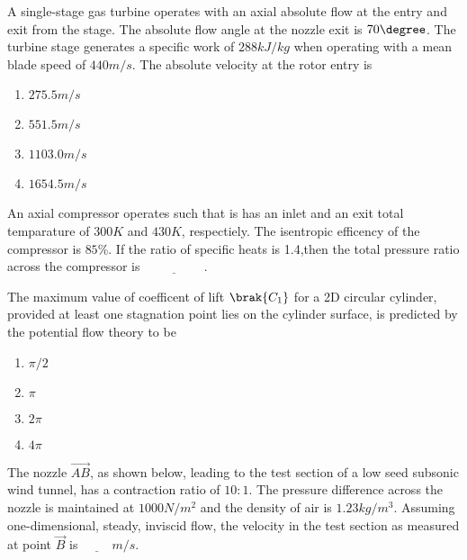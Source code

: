 
\iffalse
    \author{EE24BTECH11043}
    \section{ae}
    \chapter{2016}
\fi

	\item A single-stage gas turbine operates with an axial absolute flow at the entry and exit from the stage. The absolute flow angle at the nozzle exit is $70 \degree$. The turbine stage generates a specific work of $288 kJ/kg$ when operating with a mean blade speed of $440m/s$. The absolute velocity at the rotor entry is
		\begin{enumerate}
			\item $275.5 m/s$
			\item $551.5 m/s$
			\item $1103.0 m/s$
			\item $1654.5 m/s$
		\end{enumerate}
	\item An axial compressor operates such that is has an inlet and an exit total temparature of $300 K$ and $430 K$, respectiely. The isentropic efficency of the compressor is $85 \%$. If the ratio of specific heats is 1.4,then the total pressure ratio across the compressor is $\underline{\hspace{2cm}}$.
	\item The maximum value of coefficent of lift $\brak{C_1}$ for a 2D circular cylinder, provided at least one stagnation point lies on the cylinder surface, is predicted by the potential flow theory to be
		\begin{enumerate}
			\item $\pi/2$
			\item $\pi$
			\item $2\pi$
			\item $4\pi$
		\end{enumerate}
	\item The nozzle $\vec{AB}$, as shown below, leading to the test section of a low seed subsonic wind tunnel, has a contraction ratio of $10 : 1$. The pressure difference across the nozzle is maintained at $1000 N/m^2$ and the density of air is $1.23 kg/m^3$. Assuming one-dimensional, steady, inviscid flow, the velocity in the test section as measured at point $\vec{B}$ is $\underline{\hspace{1cm}} m/s$. \\
